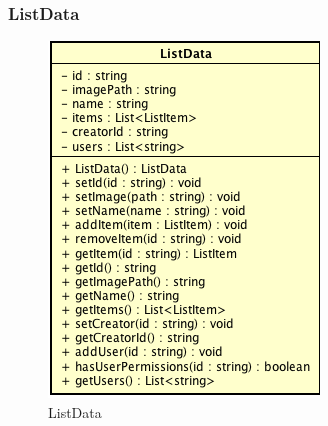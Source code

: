 \subsubsection{ListData}

\label{ListData}
\begin{figure}[ht]
	\centering
	\includegraphics[scale=0.5]{Sezioni/SottosezioniST/img/app/ListData.png}
	\caption{ListData}
\end{figure}

